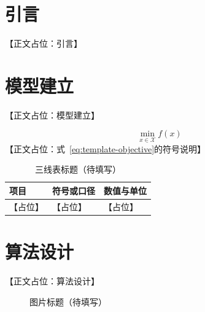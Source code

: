 \documentclass{setp-new}
\begin{document}
\maketitle

\section{引言}

【正文占位：引言】

\section{模型建立}

【正文占位：模型建立】

\begin{equation}
  \min_{x\in\mathcal{X}} f(x)
  \label{eq:template-objective}
\end{equation}
【正文占位：式~\eqref{eq:template-objective}的符号说明】

\begin{table}[htbp]
  \centering
  \caption{三线表标题（待填写）}
  \label{tab:template-three-line}
  \begin{tabular}{lll}
    \toprule
    项目 & 符号或口径 & 数值与单位 \\
    \midrule
    【占位】 & 【占位】 & 【占位】 \\
    \bottomrule
  \end{tabular}
\end{table}

\section{算法设计}

【正文占位：算法设计】

\begin{figure}[htbp]
  \centering
  \caption{图片标题（待填写）}
  \label{fig:template-image}
\end{figure}
\end{document}
